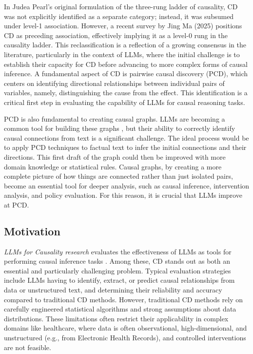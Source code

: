 \documentclass[conference]{IEEEtran}
\begin{document}
In Judea Pearl’s original formulation of the three-rung ladder of causality\cite{pearl2009causality}, CD was not explicitly identified as a separate category; instead, it was subsumed under level-1 association. However, a recent survey by Jing Ma
(2025) \cite{ma2025causalinferencelargelanguage} positions CD as preceding association, effectively implying it as a level-0 rung in the causality ladder. This reclassification is a reflection of a growing consensus in the literature, particularly in the context of LLMs, where the initial challenge is to establish their capacity for CD before advancing to more complex forms of causal inference. A fundamental aspect of CD is pairwise causal discovery (PCD), which centers on identifying directional relationships between individual pairs of variables, namely, distinguishing the cause from the effect. This identification is a critical first step in evaluating the capability of LLMs for causal reasoning tasks.

 PCD is also fundamental to creating causal graphs. LLMs are becoming a common tool for building these graphs \cite{wan2025largelanguagemodelscausal}, but their ability to correctly identify causal connections from text is a significant challenge. The ideal process would be to apply PCD techniques to factual text to infer the initial connections and their directions. This first draft of the graph could then be improved with more domain knowledge or statistical rules. Causal graphs, by creating a more complete picture of how things are connected rather than just isolated pairs, become an essential tool for deeper analysis, such as causal inference, intervention analysis, and policy evaluation. For this reason, it is crucial that LLMs improve at PCD.

\subsection{Motivation}
\textit{LLMs for Causality research} evaluates the effectiveness of LLMs as tools for performing causal inference tasks \cite{wan2025largelanguagemodelscausal}. Among these, CD stands out as both an essential and particularly challenging problem. Typical evaluation strategies include LLMs having to identify, extract, or predict causal relationships from data or unstructured text, and determining their reliability and accuracy compared to traditional CD methods. However, traditional CD methods rely on carefully engineered statistical algorithms and strong assumptions about data distributions. These limitations often restrict their applicability in complex domains like healthcare, where data is often observational, high-dimensional, and unstructured (e.g., from Electronic Health Records), and controlled interventions are not feasible.
\end{document}
